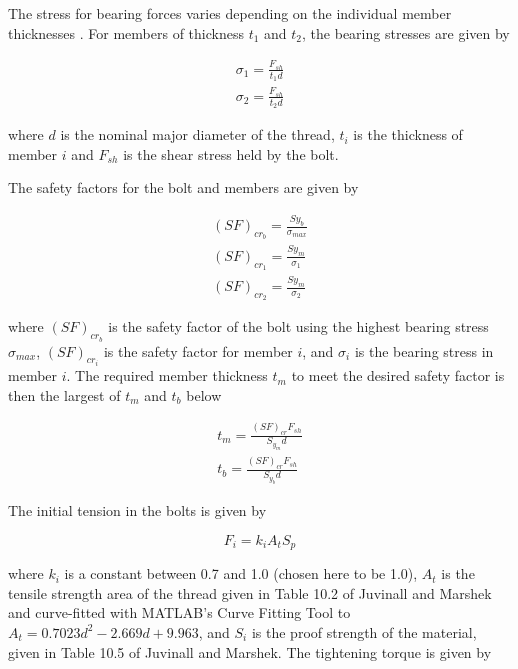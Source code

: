 The stress for bearing forces varies depending on the individual member thicknesses \cite{ahsan_mcg3131:_2018}.
For members of thickness $t_1$ and $t_2$, the bearing stresses are given by

\begin{gather}
    \sigma_1 = \frac{F_{sh}}{t_1 d}
    \\
    \sigma_2 = \frac{F_{sh}}{t_2 d}
\end{gather}{}

where $d$ is the nominal major diameter of the thread, $t_i$ is the thickness of member $i$ and $F_{sh}$ is the shear stress held by the bolt.

The safety factors for the bolt and members are given by

\begin{gather}
    (SF)_{cr_b} = \frac{S{y_b}}{\sigma_{max}}
    \\
    (SF)_{cr_1} = \frac{S{y_m}}{\sigma_1}
    \\
    (SF)_{cr_2} = \frac{S{y_m}}{\sigma_2}
\end{gather}{}

where $(SF)_{cr_b}$ is the safety factor of the bolt using the highest bearing stress $\sigma_{max}$, $(SF)_{cr_i}$ is the safety factor for member $i$, and $\sigma_i$ is the bearing stress in member $i$.
The required member thickness $t_m$ to meet the desired safety factor is then the largest of $t_m$ and $t_b$ below

\begin{gather}
    t_m = \frac{(SF)_{cr} F_{sh}}{S_{y_m} d}
    \\
    t_b = \frac{(SF)_{cr} F_{sh}}{S_{y_b} d}
\end{gather}{}


The initial tension in the bolts is given by \cite{juvinall_fundamentals_2012}

\begin{equation} \label{eq:bolt_initial_tension}
    F_i = k_i A_t S_p
\end{equation}{}

where $k_i$ is a constant between 0.7 and 1.0 (chosen here to be 1.0), $A_t$ is the tensile strength area of the thread given in Table 10.2 of Juvinall and Marshek and curve-fitted with MATLAB's Curve Fitting Tool to $A_t = 0.7023d^2 - 2.669d + 9.963$, and $S_i$ is the proof strength of the material, given in Table 10.5 of Juvinall and Marshek.
The tightening torque is given by

